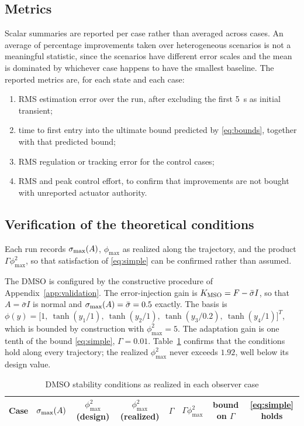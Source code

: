 \subsection{Metrics}

Scalar summaries are reported per case rather than averaged across cases.
An average of percentage improvements taken over heterogeneous scenarios is not
a meaningful statistic, since the scenarios have different error scales and the
mean is dominated by whichever case happens to have the smallest baseline.
The reported metrics are, for each state and each case:
\begin{enumerate}[label=(\roman*),leftmargin=*]
\item RMS estimation error over the run, after excluding the first
\SI{5}{s} as initial transient;
\item time to first entry into the ultimate bound predicted by
\eqref{eq:bounds}, together with that predicted bound;
\item RMS regulation or tracking error for the control cases;
\item RMS and peak control effort, to confirm that improvements are not bought
with unreported actuator authority.
\end{enumerate}

\subsection{Verification of the theoretical conditions}

Each run records $\sigma_{\max}(A)$, $\phi_{\max}$ as realized along the
trajectory, and the product $\Gamma\phi_{\max}^2$, so that satisfaction of
\eqref{eq:simple} can be confirmed rather than assumed.

The DMSO is configured by the constructive procedure of
Appendix~\ref{app:validation}. The error-injection gain is $K_{\mathrm{MSO}}=F-\bar\sigma I$,
so that $A=\bar\sigma I$ is normal and $\sigma_{\max}(A)=\bar\sigma=0.5$ exactly. The
basis is $\phi(y)=\bigl[1,\ \tanh(y_1/1),\ \tanh(y_2/1),\ \tanh(y_3/0.2),\
\tanh(y_4/1)\bigr]^T$, which is bounded by construction with
$\phi_{\max}^2=5$. The adaptation gain is one tenth of the bound
\eqref{eq:simple}, $\Gamma=0.01$. Table~\ref{tab:obscond} confirms that the
conditions hold along every trajectory; the realized $\phi_{\max}^2$ never
exceeds $1.92$, well below its design value.

\begin{table}[htbp]
\centering
\caption{DMSO stability conditions as realized in each observer case}
\label{tab:obscond}
\small
\begin{tabular}{lccccccc}
\toprule
Case & $\sigma_{\max}(A)$ & $\phi_{\max}^2$ (design) & $\phi_{\max}^2$ (realized) & $\Gamma$
     & $\Gamma\phi_{\max}^2$ & bound on $\Gamma$ & \eqref{eq:simple} holds \\
\midrule

\end{tabular}
\end{table}

